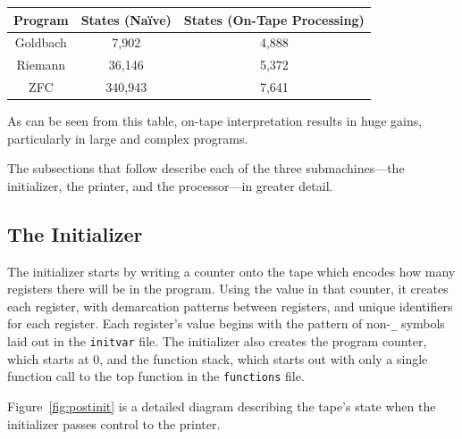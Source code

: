 \documentclass[11pt]{article}
\newcommand{\statenum}{7,641 }
\newcommand{\gbstatenum}{4,888 }
\newcommand{\rmstatenum}{5,372 }
\begin{document}
\begin{center}
    \begin{tabular}{||c c c||}
    \hline
    Program & States (Na\"ive) & States (On-Tape Processing) \\ [0.5ex]
    \hline
    Goldbach & 7,902 & \gbstatenum\\
    \hline
    Riemann & 36,146 & \rmstatenum\\
    \hline 
    ZFC & 340,943 & \statenum\\
    \hline
    \end{tabular}
\end{center}

As can be seen from this table, on-tape interpretation results in huge gains, particularly in large and complex programs. 

The subsections that follow describe each of the three submachines---the initializer, the printer, and the processor---in greater detail.
 
\subsection{The Initializer}

The initializer starts by writing a counter onto the tape which encodes how many registers there will be in the program. Using the value in that counter, it creates each register, with demarcation patterns between registers, and unique identifiers for each register. Each register's value begins with the pattern of non-\texttt{\_} symbols laid out in the \texttt{initvar} file. The initializer also creates the program counter, which starts at 0, and the function stack, which starts out with only a single function call to the top function in the \texttt{functions} file.

Figure~\ref{fig:postinit} is a detailed diagram describing the tape's state when the initializer passes control to the printer. 
\end{document}
